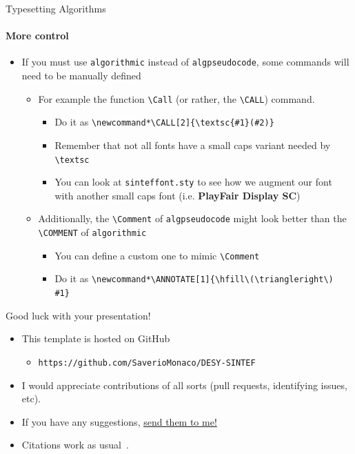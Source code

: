 \documentclass{beamer}
\newcommand{\hrefcol}[2]{\textcolor{uihteal}{\href{#1}{#2}}}
\begin{document}
\begin{frame}[fragile]{Typesetting Algorithms}
	\framesubtitle{More control}
	\begin{itemize}
		\item If you must use \texttt{algorithmic} instead of \texttt{algpseudocode}, some commands will need to be manually defined
		      \begin{itemize}
			      \item For example the function \verb|\Call| (or rather, the \verb|\CALL|) command.
			            \begin{itemize}
				            \item Do it as \verb|\newcommand*\CALL[2]{\textsc{#1}(#2)}|
				            \item Remember that not all fonts have a small caps variant needed by \verb|\textsc|
				            \item You can look at \texttt{sinteffont.sty} to see how we augment our font with another small caps font (i.e. \textbf{PlayFair Display SC})
			            \end{itemize}
			      \item Additionally, the \verb|\Comment| of \texttt{algpseudocode} might look better than the \verb|\COMMENT| of \texttt{algorithmic}
			            \begin{itemize}
				            \item You can define a custom one to mimic \verb|\Comment|
				            \item Do it as \verb|\newcommand*\ANNOTATE[1]{\hfill\(\triangleright\) #1}|
			            \end{itemize}
		      \end{itemize}
	\end{itemize}
\end{frame}

\begin{frame}{Good luck with your presentation!}
	\begin{itemize}
		\item This template is hosted on GitHub
		      \begin{itemize}
			      \item  \texttt{https://github.com/SaverioMonaco/DESY-SINTEF}
		      \end{itemize}
		\item  I would appreciate contributions of all sorts (pull requests, identifying issues, etc).
		\item  If you have any suggestions,
		      \hrefcol{mailto:saverio.monaco@desy.de}{send them to me!}
		\item Citations work as usual~\cite{tantau2023beamer}.
	\end{itemize}
\end{frame}
\end{document}
